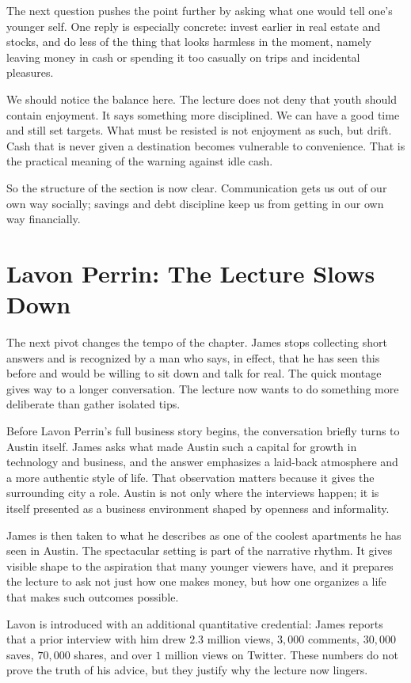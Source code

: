 The next question pushes the point further by asking what one would tell one's younger self. One reply is especially concrete: invest earlier in real estate and stocks, and do less of the thing that looks harmless in the moment, namely leaving money in cash or spending it too casually on trips and incidental pleasures.

We should notice the balance here. The lecture does not deny that youth should contain enjoyment. It says something more disciplined. We can have a good time and still set targets. What must be resisted is not enjoyment as such, but drift. Cash that is never given a destination becomes vulnerable to convenience. That is the practical meaning of the warning against idle cash.

So the structure of the section is now clear. Communication gets us out of our own way socially; savings and debt discipline keep us from getting in our own way financially.

\section{Lavon Perrin: The Lecture Slows Down}

The next pivot changes the tempo of the chapter. James stops collecting short answers and is recognized by a man who says, in effect, that he has seen this before and would be willing to sit down and talk for real. The quick montage gives way to a longer conversation. The lecture now wants to do something more deliberate than gather isolated tips.

Before Lavon Perrin's full business story begins, the conversation briefly turns to Austin itself. James asks what made Austin such a capital for growth in technology and business, and the answer emphasizes a laid-back atmosphere and a more authentic style of life. That observation matters because it gives the surrounding city a role. Austin is not only where the interviews happen; it is itself presented as a business environment shaped by openness and informality.

James is then taken to what he describes as one of the coolest apartments he has seen in Austin. The spectacular setting is part of the narrative rhythm. It gives visible shape to the aspiration that many younger viewers have, and it prepares the lecture to ask not just how one makes money, but how one organizes a life that makes such outcomes possible.

Lavon is introduced with an additional quantitative credential: James reports that a prior interview with him drew \(2.3\) million views, \(3{,}000\) comments, \(30{,}000\) saves, \(70{,}000\) shares, and over \(1\) million views on Twitter. These numbers do not prove the truth of his advice, but they justify why the lecture now lingers.

